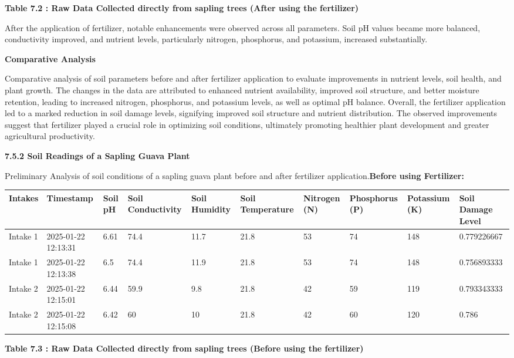 \documentclass{book} %
\begin{document}
\textbf{Table 7.2 : Raw Data Collected directly from sapling trees (After using the fertilizer)}

\noindent After the application of fertilizer, notable enhancements were observed across all parameters. Soil pH values became more balanced, conductivity improved, and nutrient levels, particularly nitrogen, phosphorus, and potassium, increased substantially.

\noindent \textbf{Comparative Analysis}

\noindent Comparative analysis of soil parameters before and after fertilizer application to evaluate improvements in nutrient levels, soil health, and plant growth. The changes in the data are attributed to enhanced nutrient availability, improved soil structure, and better moisture retention, leading to increased nitrogen, phosphorus, and potassium levels, as well as optimal pH balance. Overall, the fertilizer application led to a marked reduction in soil damage levels, signifying improved soil structure and nutrient distribution. The observed improvements suggest that fertilizer played a crucial role in optimizing soil conditions, ultimately promoting healthier plant development and greater agricultural productivity. 

\noindent \textbf{7.5.2 Soil Readings of a Sapling Guava Plant}

\noindent Preliminary Analysis of soil conditions of a sapling guava plant before and after fertilizer application.\textbf{Before using Fertilizer:}

\begin{tabular}{|p{0.4in}|p{0.4in}|p{0.4in}|p{0.4in}|p{0.4in}|p{0.4in}|p{0.4in}|p{0.4in}|p{0.4in}|p{0.4in}|} \hline 
Intakes & Timestamp & Soil pH & Soil Conductivity & Soil Humidity & Soil Temperature & Nitrogen (N) & Phosphorus (P) & Potassium (K) & Soil Damage Level \\ \hline 
Intake 1 & 2025-01-22 12:13:31 & 6.61 & 74.4 & 11.7 & 21.8 & 53 & 74 & 148 & 0.779226667 \\ \hline 
Intake 1 & 2025-01-22 12:13:38 & 6.5 & 74.4 & 11.9 & 21.8 & 53 & 74 & 148 & 0.756893333 \\ \hline 
Intake 2 & 2025-01-22 12:15:01 & 6.44 & 59.9 & 9.8 & 21.8 & 42 & 59 & 119 & 0.793343333 \\ \hline 
Intake 2 & 2025-01-22 12:15:08 & 6.42 & 60 & 10 & 21.8 & 42 & 60 & 120 & 0.786 \\ \hline 
\end{tabular}

\textbf{Table 7.3 : Raw Data Collected directly from sapling trees (Before using the fertilizer)}
\end{document}
